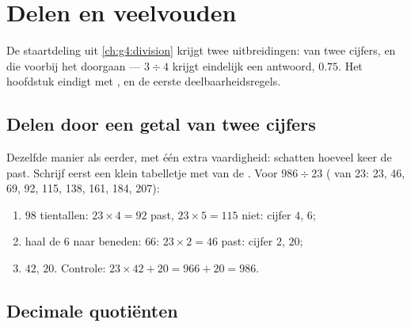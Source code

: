 \chapter{Delen en veelvouden}\label{ch:g5:division}

De staartdeling uit \cref{ch:g4:division} krijgt twee uitbreidingen: 
van twee cijfers, en  die voorbij het  doorgaan ---
$3 \div 4$ krijgt eindelijk een antwoord, $0.75$. Het hoofdstuk eindigt met
,  en de eerste deelbaarheidsregels.

\section{Delen door een getal van twee cijfers}

\begin{method}\label{met:g5:division:twodigits}
Dezelfde manier als eerder, met één extra vaardigheid: schatten hoeveel keer
de  past. Schrijf eerst een klein tabelletje met  van de
. Voor $986 \div 23$ ( van 23: 23, 46, 69, 92, 115, 138, 161,
184, 207):
\begin{enumerate}
  \item $98$ tientallen: $23 \times 4 = 92$ past, $23 \times 5 = 115$ niet:
        cijfer $4$,  $6$;
  \item haal de $6$ naar beneden: $66$: $23 \times 2 = 46$ past: cijfer
        $2$,  $20$;
  \item {} $42$,  $20$. Controle:
        $23 \times 42 + 20 = 966 + 20 = 986$.
\end{enumerate}
\end{method}

\section{Decimale quotiënten}

